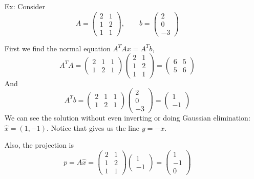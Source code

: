 \documentclass[reqno]{amsart}
\theoremstyle{definition}
\begin{document}
\begin{itemize}
\pagebreak

\item[Ex:  ]  Consider
%
\begin{equation*}
A = \begin{pmatrix}
2 & 1\\
1 & 2\\
1 & 1
\end{pmatrix},\qquad b = \begin{pmatrix}
2\\
0\\
-3
\end{pmatrix}
\end{equation*}

First we find the normal equation $A^TAx = A^Tb$,
%
\begin{equation*}
A^TA = \begin{pmatrix}
2 & 1 & 1\\
1 & 2 & 1
\end{pmatrix} \begin{pmatrix}
2 & 1\\
1 & 2\\
1 & 1
\end{pmatrix} = \begin{pmatrix}
6 & 5\\
5 & 6
\end{pmatrix}
\end{equation*}
%
And
%
\begin{equation*}
A^Tb = \begin{pmatrix}
2 & 1 & 1\\
1 & 2 & 1
\end{pmatrix} \begin{pmatrix}
2\\
0\\
-3
\end{pmatrix} = \begin{pmatrix}
1\\
-1
\end{pmatrix}
\end{equation*}
%
We can see the solution without even inverting or doing Gaussian elimination: $\hat{x} = (1, -1)$.
Notice that gives us the line $y = -x$.

Also, the projection is
%
\begin{equation*}
p = A\hat{x} = \begin{pmatrix}
2 & 1\\
1 & 2\\
1 & 1
\end{pmatrix}\begin{pmatrix}
1\\
-1
\end{pmatrix} = \begin{pmatrix}
1\\
-1\\
0
\end{pmatrix}
\end{equation*}


\end{itemize}
\end{document}
